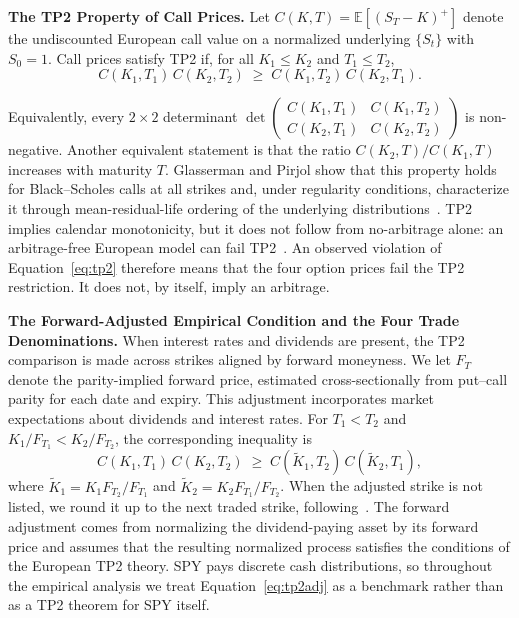 \documentclass[sigconf,review,anonymous]{acmart}
\begin{document}
\smallskip\noindent\textbf{The TP2 Property of Call Prices.}
\label{sec:tp2theory}
Let $C(K,T)=\mathbb{E}[(S_T-K)^+]$ denote the undiscounted European call value on a normalized underlying $\{S_t\}$ with $S_0=1$. Call prices satisfy TP2 if, for all $K_1\le K_2$ and $T_1\le T_2$,
\begin{equation}
C(K_1,T_1)\,C(K_2,T_2)\;\ge\;C(K_1,T_2)\,C(K_2,T_1).
\label{eq:tp2}
\end{equation}
{\sloppy Equivalently, every $2\times2$ determinant
$\det\left(\begin{smallmatrix} C(K_1,T_1) & C(K_1,T_2)\\ C(K_2,T_1) & C(K_2,T_2)\end{smallmatrix}\right)$
is non-negative. Another equivalent statement is that the ratio $C(K_2,T)/C(K_1,T)$ increases with maturity $T$. Glasserman and Pirjol show that this property holds for Black--Scholes calls at all strikes and, under regularity conditions, characterize it through mean-residual-life ordering of the underlying distributions~\cite{glasserman2026tp2theory}. TP2 implies calendar monotonicity, but it does not follow from no-arbitrage alone: an arbitrage-free European model can fail TP2~\cite{glasserman2026tp2theory,glasserman2023convexity}. An observed violation of Equation~\eqref{eq:tp2} therefore means that the four option prices fail the TP2 restriction. It does not, by itself, imply an arbitrage.\par}

\smallskip\noindent\textbf{The Forward-Adjusted Empirical Condition and the Four Trade Denominations.}
\label{sec:denominations}
When interest rates and dividends are present, the TP2 comparison is made across strikes aligned by forward moneyness. We let $F_T$ denote the parity-implied forward price, estimated cross-sectionally from put--call parity for each date and expiry. This adjustment incorporates market expectations about dividends and interest rates. For $T_1<T_2$ and $K_1/F_{T_1}<K_2/F_{T_2}$, the corresponding inequality is
\begin{equation}
C(K_1,T_1)\,C(K_2,T_2)\;\ge\;C(\tilde K_1,T_2)\,C(\tilde K_2,T_1),
\label{eq:tp2adj}
\end{equation}
where $\tilde K_1=K_1 F_{T_2}/F_{T_1}$ and $\tilde K_2=K_2 F_{T_1}/F_{T_2}$. When the adjusted strike is not listed, we round it up to the next traded strike, following~\cite{glasserman2025tp2}.
The forward adjustment comes from normalizing the dividend-paying asset by its forward price and assumes that the resulting normalized process satisfies the conditions of the European TP2 theory. SPY pays discrete cash distributions, so throughout the empirical analysis we treat Equation~\eqref{eq:tp2adj} as a benchmark rather than as a TP2 theorem for SPY itself.
\end{document}
